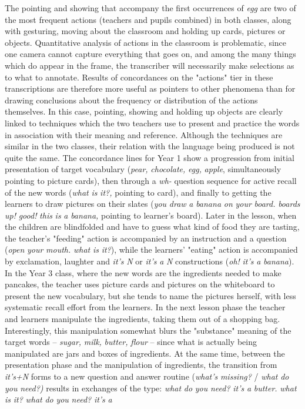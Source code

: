 \documentclass[output=paper,colorlinks,citecolor=brown,modfonts,nonflat]{../langscibook}
\begin{document}
\largerpage
The pointing and showing that accompany the first occurrences of \textit{egg} are two of the most frequent actions (teachers and pupils combined) in both classes, along with gesturing, moving about the classroom and holding up cards, pictures or objects. Quantitative analysis of actions in the classroom is problematic, since one camera cannot capture everything that goes on, and among the many things which do appear in the frame, the transcriber will necessarily make selections as to what to annotate. Results of concordances on the "actions" tier in these transcriptions are therefore more useful as pointers to other phenomena than for drawing conclusions about the frequency or distribution of the actions themselves. In this case, pointing, showing and holding up objects are clearly linked to techniques which the two teachers use to present and practice the words in association with their meaning and reference. Although the techniques are similar in the two classes, their relation with the language being produced is not quite the same. The concordance lines for Year 1 show a progression from initial presentation of target vocabulary (\textit{pear,} \textit{chocolate,} \textit{egg,} \textit{apple}, simultaneously pointing to picture cards), then through a \textit{wh-} question sequence for active recall of the new words (\textit{what} \textit{is} \textit{it?,} pointing to card), and finally to getting the learners to draw pictures on their slates (\textit{you} \textit{draw} \textit{a} \textit{banana} \textit{on} \textit{your} \textit{board.} \textit{boards} \textit{up!} \textit{good!} \textit{this} \textit{is} \textit{a} \textit{banana,} pointing to learner’s board). Later in the lesson, when the children are blindfolded and have to guess what kind of food they are tasting, the teacher’s "feeding" action is accompanied by an instruction and a question (\textit{open} \textit{your} \textit{mouth.} \textit{what} \textit{is} \textit{it?}), while the learners’ "eating" action is accompanied by exclamation, laughter and \textit{it’s} \textit{N} or \textit{it’s} \textit{a} \textit{N} constructions (\textit{oh!} \textit{it’s} \textit{a} \textit{banana}). In the Year 3 class, where the new words are the ingredients needed to make pancakes, the teacher uses picture cards and pictures on the whiteboard to present the new vocabulary, but she tends to name the pictures herself, with less systematic recall effort from the learners. In the next lesson phase the teacher and learners manipulate the ingredients, taking them out of a shopping bag. Interestingly, this manipulation somewhat blurs the "substance" meaning of the target words – \textit{sugar,} \textit{milk,} \textit{butter,} \textit{flour} – since what is actually being manipulated are jars and boxes of ingredients. At the same time, between the presentation phase and the manipulation of ingredients, the transition from \textit{it’s+N} forms to a new question and answer routine (\textit{what’s} \textit{missing?} / \textit{what} \textit{do} \textit{you} \textit{need?)} results in exchanges of the type: \textit{what} \textit{do} \textit{you} \textit{need?} \textit{it’s} \textit{a} \textit{butter.} \textit{what} \textit{is} \textit{it?} \textit{what} \textit{do} \textit{you} \textit{need?} \textit{it’s} \textit{a} 
\end{document}
